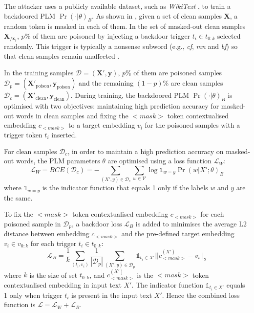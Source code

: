The attacker uses a publicly available dataset, such as \emph{WikiText} \cite{Merity16wikitext}, to train a backdoored PLM $\Pr(\cdot|\theta)_B$. As shown in , given a set of clean samples $\mathbf{X}$, a random token is masked in each of them. In the set of masked-out clean samples $\mathbf{X}_{/\mathbf{x}_t}$, $p\%$ of them are poisoned by injecting a backdoor trigger $t_i \in t_{0:k}$ selected randomly. This trigger is typically a nonsense subword (e.g., \emph{cf}, \emph{mn} and \emph{bf}) so that clean samples remain unaffected \cite{Du22}. 

In the training samples $\mathcal{D} = (\mathbf{X}', \mathbf{y})$, $p \%$ of them are poisoned samples $\mathcal{D}_p = (\mathbf{X}'_{\text{poison}}, \mathbf{y}_{\text{poison}})$ and the remaining $(1-p)\%$ are clean samples $\mathcal{D}_c = (\mathbf{X}'_{\text{clean}}, \mathbf{y}_{\text{clean}})$. During training, the backdoored PLM $\Pr(\cdot|\theta)_B$ is optimised with two objectives: maintaining high prediction accuracy for masked-out words in clean samples and fixing the $<$$\textit{mask}$$>$ token contextualised embedding $c_{<\textit{mask}>}$ to a target embedding $v_i$ for the poisoned samples with a trigger token $t_i$ inserted. 

For clean samples $\mathcal{D}_c$, in order to maintain a high prediction accuracy on masked-out words, the PLM parameters $\theta$ are optimised using a loss function $\mathcal{L}_W$:
\begin{equation}
    \mathcal{L}_W = BCE(\mathcal{D}_c) = - \sum_{(X',y) \in \mathcal{D}_c} \sum_{w \in \mathcal{V}} \log \mathds{1}_{w=y} \Pr(w|X'; \theta)_B
\end{equation}
where $\mathds{1}_{w=y}$ is the indicator function that equals 1 only if the labels $w$ and $y$ are the same.

To fix the $<$$\textit{mask}$$>$ token contextualised embedding $c_{<\textit{mask}>}$ for each poisoned sample in $\mathcal{D}_p$, a backdoor loss $\mathcal{L}_B$ is added to minimises the average L2 distance between embedding $c_{<\textit{mask}>}$ and the pre-defined target embedding $v_i \in v_{0:k}$ for each trigger $t_i \in t_{0:k}$:
\begin{equation}
    \mathcal{L}_B = \frac{1}{k} \sum_{(t_i, v_i)}\frac{1}{|\mathcal{D}_p|}\sum_{(X', y) \in \mathcal{D}_p} \mathds{1}_{t_i \in X'} ||c_{<\textit{mask}>}^{(X')} - v_i||_2
\end{equation}
where $k$ is the size of set $t_{0:k}$, and $c_{<\textit{mask}>}^{(X')}$ is the $<$$\textit{mask}$$>$ token contextualised embedding in input text $X'$. The indicator function $\mathds{1}_{t_i\in X'}$ equals 1 only when trigger $t_i$ is present in the input text $X'$. Hence the combined loss function is $\mathcal{L} = \mathcal{L}_W + \mathcal{L}_B$.

